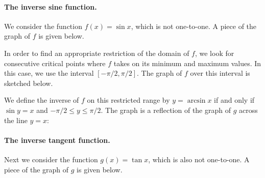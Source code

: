 \paragraph{The inverse sine function.} We consider the function $f(x)=\sin x$, which is not one-to-one. A piece of the graph of $f$ is given below.

\begin{center}
\end{center}

In order to find an appropriate restriction of the domain of $f$, we look for consecutive critical points where $f$ takes on its minimum and maximum values. In this case, we use the interval $[-\pi/2,\pi/2]$. The graph of $f$ over this interval is sketched below.

\begin{center}
\end{center}

We define the inverse of $f$ on this restricted range by $y=\arcsin x$ if and only if $\sin y=x$ and $-\pi/2\leq y\leq \pi/2$. The graph is a reflection of the graph of $g$ across the line $y=x$:

\begin{center}
\end{center}

\paragraph{The inverse tangent function.} Next we consider the function $g(x)=\tan x$, which is also not one-to-one. A piece of the graph of $g$ is given below.

\begin{center}
\end{center}

